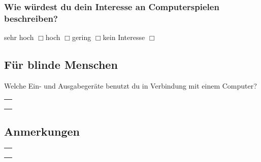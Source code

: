 \subsubsection*{Wie würdest du dein Interesse an Computerspielen beschreiben?}\noindent
sehr hoch $\Box{}$\hspace{0.5cm}hoch $\Box{}$\hspace{0.5cm}gering
$\Box{}$\hspace{0.5cm}kein Interesse $\Box{}$

\subsection*{Für blinde Menschen}
\noindent
Welche Ein- und Ausgabegeräte benutzt du in Verbindung mit einem Computer?
\begin{table}[h]
\begin{tabular}{p{}}
\\
\hline
\\
\hline
\\
\hline
\\
\hline
\\
\hline
\end{tabular}
\end{table}


\subsection*{Anmerkungen}
\begin{table}[h]
\begin{tabular}{p{}}
\\
\hline
\\
\hline
\\
\hline
\\
\hline
\\
\hline
\end{tabular}
\end{table}